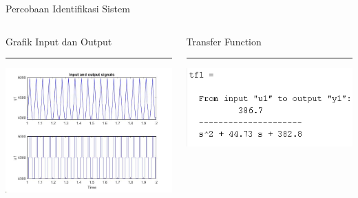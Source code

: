 \documentclass[10pt,xcolor={dvipsnames}]{beamer}
\begin{document}
\begin{frame}{Percobaan Identifikasi Sistem}
	\begin{columns}[T] %
		\begin{column}{0.48\textwidth}
			Grafik Input dan Output
			\color{black}\rule{\linewidth}{4pt}
			\includegraphics[width=7.5cm]{Coba Sistem Identification/timeplot.jpg}
		\end{column}%
		\hfill%
		\begin{column}{0.48\textwidth}
			Transfer Function
			\color{blue}\rule{\linewidth}{4pt}
			\begin{center}
				\includegraphics[width=7.5cm]{Coba Sistem Identification/hasiltf1.png}
			\end{center}
		\end{column}
	\end{columns}
\end{frame}
\end{document}
